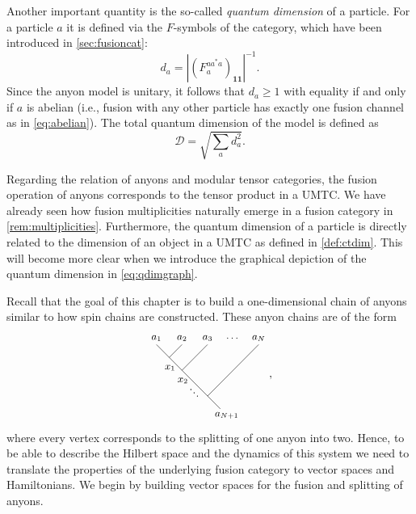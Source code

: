 Another important quantity is the so-called \emph{quantum dimension} of a particle. For a particle $a$ it is defined via the $F$-symbols of the category, which have been introduced in \cref{sec:fusioncat}:
	\begin{equation}
	\label{eq:qdimF}
		d_a=\left|\left(F_a^{aa^* a}\right)_{\mathbf{1}\mathbf{1}}\right|^{-1}.
	\end{equation}
Since the anyon model is unitary, it follows that $d_a\ge 1$ with equality if and only if $a$ is abelian (i.e., fusion with any other particle has exactly one fusion channel as in \cref{eq:abelian}). The total quantum dimension of the model is defined as
	\begin{equation}
		\mathcal{D}=\sqrt{\sum_a d_a^2}.
	\end{equation}

Regarding the relation of anyons and modular tensor categories, the fusion operation of anyons corresponds to the tensor product in a UMTC. We have already seen how fusion multiplicities naturally emerge in a fusion category in \cref{rem:multiplicities}. Furthermore, the quantum dimension of a particle is directly related to the dimension of an object in a UMTC as defined in \cref{def:ctdim}. This will become more clear when we introduce the graphical depiction of the quantum dimension in \cref{eq:qdimgraph}.

Recall that the goal of this chapter is to build a one-dimensional chain of anyons similar to how spin chains are constructed. These anyon chains are of the form 
	\begin{equation}
		\begin{tikzpicture}[scale=0.8,baseline=(current bounding box.center)]
			\draw (0,0) -- (-2.5,2.5);
			\draw (-0.5,0.5) -- (1.5,2.5);
			\draw (-1.5,1.5) -- (-0.5,2.5);
			\draw (-2,2) -- (-1.5,2.5);
			\node at (0.25,-0.25) {\small $a_{N+1}$};
			\node at (-2.5,2.75) {\small $a_1$};
			\node at (-1.5,2.75) {\small $a_2$};
			\node at (-0.5,2.75) {\small $a_3$};
			\node at (1.5,2.75) {\small $a_N$};
			\node at (0.5,2.75) {\small $\dots$};
			\node at (-1.9,1.6) {\small $x_1\ $};
			\node at (-1.4,1.1) {\small $x_2\ $};
			\node at (-1,0.6) {\rotatebox{-45}{\small $\dots$}};
		\end{tikzpicture},
	\end{equation}
where every vertex corresponds to the splitting of one anyon into two. Hence, to be able to describe the Hilbert space and the dynamics of this system we need to translate the properties of the underlying fusion category to vector spaces and Hamiltonians. We begin by building vector spaces for the fusion and splitting of anyons.	


